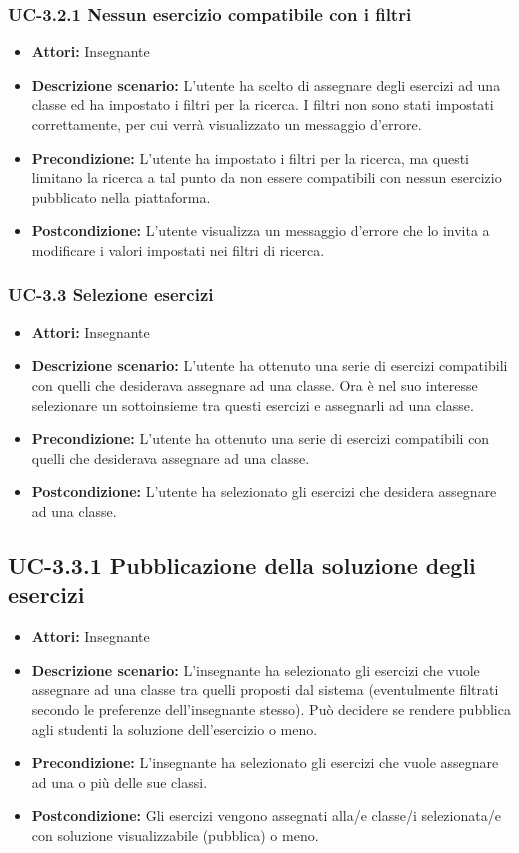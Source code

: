 \subsubsection{UC-3.2.1 Nessun esercizio compatibile con i filtri}
\begin{itemize}
		\item \textbf{Attori: } Insegnante
		\item \textbf{Descrizione scenario: }L'utente ha scelto di assegnare degli esercizi ad una classe ed ha impostato i filtri per la ricerca. I filtri non sono stati impostati correttamente, per cui verrà visualizzato un messaggio d'errore.
		\item \textbf{Precondizione: }L'utente ha impostato i filtri per la ricerca, ma questi limitano la ricerca a tal punto da non essere compatibili con nessun esercizio pubblicato nella piattaforma.
		\item \textbf{Postcondizione: }L'utente visualizza un messaggio d'errore che lo invita a modificare i valori impostati nei filtri di ricerca.
\end{itemize}
\subsubsection{UC-3.3 Selezione esercizi}
\begin{itemize}
		\item \textbf{Attori: } Insegnante
		\item \textbf{Descrizione scenario: }L'utente ha ottenuto una serie di esercizi compatibili con quelli che desiderava assegnare ad una classe. Ora è nel suo interesse selezionare un sottoinsieme tra questi esercizi e assegnarli ad una classe.
		\item \textbf{Precondizione: }L'utente ha ottenuto una serie di esercizi compatibili con quelli che desiderava assegnare ad una classe.
		\item \textbf{Postcondizione: }L'utente ha selezionato gli esercizi che desidera assegnare ad una classe.
\end{itemize}
\subsection{UC-3.3.1 Pubblicazione della soluzione degli esercizi}
\begin{itemize}
	\item \textbf{Attori:} Insegnante
	\item \textbf{Descrizione scenario:} L'insegnante ha selezionato gli esercizi che vuole assegnare ad una classe tra quelli proposti dal sistema (eventulmente filtrati secondo le preferenze dell'insegnante stesso). Può decidere se rendere pubblica agli studenti la soluzione dell'esercizio o meno.
	\item \textbf{Precondizione:} L'insegnante ha selezionato gli esercizi che vuole assegnare ad una o più delle sue classi.
	\item \textbf{Postcondizione:} Gli esercizi vengono assegnati alla/e classe/i selezionata/e con soluzione visualizzabile (pubblica) o meno.
\end{itemize}

